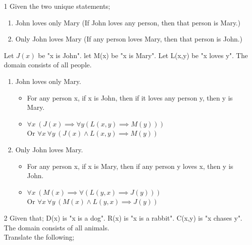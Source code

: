 \documentclass[12pt, letterpaper]{article}
\newcommand{\exheader}[1][ex]{{\tiny{#1}\normalsize}}
\begin{document}
\exheader[1] Given the two unique statements;
\begin{enumerate}
	\item John loves only Mary (If John loves any person, then that person is Mary.)
	\item Only John loves Mary (If any person loves Mary, then that person is John.)
\end{enumerate}
Let $J(x)$ be "x is John". let M(x) be "x is Mary". Let L(x,y) be "x loves y". The domain consists of all people.
\begin{enumerate}
	\item John loves only Mary.
	\begin{itemize}[leftmargin=0.3cm, label={\faAngleRight}]
		\item For any person x, if x is John, then if it loves any person y, then y is Mary.
		\item $\forall x \ (J(x) \implies \forall y (L(x,y) \implies M(y)))$ \\ Or $\forall x \ \forall y \ (J(x) \land L(x,y) \implies M(y))$
	\end{itemize}
	\item Only John loves Mary.
	\begin{itemize}[leftmargin=0.3cm, label={\faAngleRight}]
		\item For any person x, if x is Mary, then if any person y loves x, then y is John.
		\item $\forall x \ (M(x) \implies \forall (L(y,x) \implies J(y)))$ \\ Or $\forall x \ \forall y \ (M(x) \land L(y,x) \implies J(y))$
	\end{itemize}
\end{enumerate}
\bigbreak
\exheader[2] Given that; D(x) is "x is a dog". R(x) is "x is a rabbit". C(x,y) is "x chases y". The domain consists of all animals. \\ Translate the following;
\end{document}
